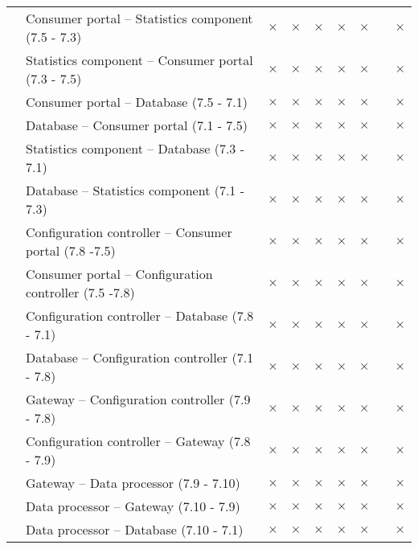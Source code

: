 \begin{longtable}{p{2.3cm} p{9cm} p{0.2cm} p{0.2cm} p{0.2cm} p{0.2cm}p{0.2cm} p{0.2cm} p{0.2cm} }
		   &  Consumer portal -- Statistics component (7.5 - 7.3) & $\times$ & $\times$ & $\times$& $\times$ &  $\times$ & & $\times$\\
		   &  Statistics component -- Consumer portal (7.3 - 7.5) & $\times$ & $\times$ & $\times$& $\times$ &  $\times$ & & $\times$\\
		   &  Consumer portal -- Database (7.5 - 7.1) & $\times$ & $\times$ & $\times$& $\times$ &  $\times$ & & $\times$\\
		   &  Database -- Consumer portal (7.1 - 7.5) & $\times$ & $\times$ & $\times$& $\times$ &  $\times$ & & $\times$\\
		   &  Statistics component -- Database (7.3 - 7.1) & $\times$ & $\times$ & $\times$& $\times$ &  $\times$ & & $\times$\\
		   &  Database -- Statistics component (7.1 - 7.3) & $\times$ & $\times$ & $\times$& $\times$ &  $\times$ & & $\times$\\
		   &  Configuration controller -- Consumer portal (7.8 -7.5) & $\times$ & $\times$ & $\times$& $\times$ &  $\times$ & & $\times$\\
		   &  Consumer portal -- Configuration controller (7.5 -7.8) & $\times$ & $\times$ & $\times$& $\times$ &  $\times$ & & $\times$\\
		   &  Configuration controller -- Database (7.8 - 7.1) & $\times$ & $\times$ & $\times$& $\times$ &  $\times$ & & $\times$\\
		   &  Database -- Configuration controller (7.1 - 7.8) & $\times$ & $\times$ & $\times$& $\times$ &  $\times$ & & $\times$\\
		   &  Gateway -- Configuration controller (7.9 - 7.8) & $\times$ & $\times$ & $\times$& $\times$ &  $\times$ & & $\times$\\
		   &  Configuration controller -- Gateway (7.8 - 7.9) & $\times$ & $\times$ & $\times$& $\times$ &  $\times$ & & $\times$\\
		   &  Gateway -- Data processor (7.9 - 7.10) & $\times$ & $\times$ & $\times$& $\times$ &  $\times$ & & $\times$\\
		   &  Data processor -- Gateway (7.10 - 7.9) & $\times$ & $\times$ & $\times$& $\times$ &  $\times$ & & $\times$\\
		   &  Data processor -- Database (7.10 - 7.1) & $\times$ & $\times$ & $\times$& $\times$ &  $\times$ & & $\times$\\

\end{longtable}
